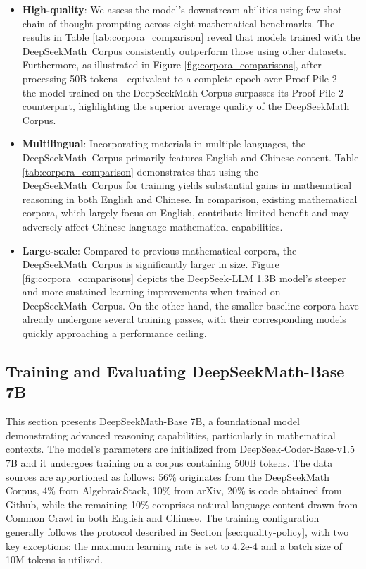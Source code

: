 \begin{itemize}[topsep=0pt]
\begin{itemize}[topsep=0pt]
    \item \textbf{High-quality}:
    We assess the model’s downstream abilities using few-shot chain-of-thought prompting \cite{cot} across eight mathematical benchmarks. The results in Table \ref{tab:corpora_comparison} reveal that models trained with the DeepSeekMath~Corpus consistently outperform those using other datasets. Furthermore, as illustrated in Figure \ref{fig:corpora_comparisons}, after processing 50B tokens—equivalent to a complete epoch over Proof-Pile-2—the model trained on the DeepSeekMath Corpus surpasses its Proof-Pile-2 counterpart, highlighting the superior average quality of the DeepSeekMath Corpus. 
    \item \textbf{Multilingual}:
    Incorporating materials in multiple languages, the DeepSeekMath~Corpus primarily features English and Chinese content. Table \ref{tab:corpora_comparison} demonstrates that using the DeepSeekMath~Corpus for training yields substantial gains in mathematical reasoning in both English and Chinese. In comparison, existing mathematical corpora, which largely focus on English, contribute limited benefit and may adversely affect Chinese language mathematical capabilities.
    \item \textbf{Large-scale}:
    Compared to previous mathematical corpora, the DeepSeekMath~Corpus is significantly larger in size. Figure \ref{fig:corpora_comparisons} depicts the DeepSeek-LLM 1.3B model’s steeper and more sustained learning improvements when trained on DeepSeekMath~Corpus. On the other hand, the smaller baseline corpora have already undergone several training passes, with their corresponding models quickly approaching a performance ceiling.
\end{itemize}

\subsection{Training and Evaluating DeepSeekMath-Base 7B}

This section presents DeepSeekMath-Base 7B, a foundational model demonstrating advanced reasoning capabilities, particularly in mathematical contexts. The model's parameters are initialized from DeepSeek-Coder-Base-v1.5 7B \citep{deepseek-coder} and it undergoes training on a corpus containing 500B tokens. The data sources are apportioned as follows: 56\% originates from the DeepSeekMath Corpus, 4\% from AlgebraicStack, 10\% from arXiv, 20\% is code obtained from Github, while the remaining 10\% comprises natural language content drawn from Common Crawl in both English and Chinese. The training configuration generally follows the protocol described in Section \ref{sec:quality-policy}, with two key exceptions: the maximum learning rate is set to 4.2e-4 and a batch size of 10M tokens is utilized.


\end{itemize}

